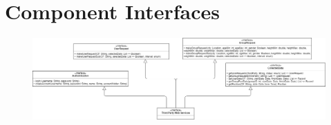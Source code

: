 \section{Component Interfaces}

\begin{figure}[H]
    \centering
    \includegraphics[scale=0.4]{DD/Pictures/compInterfDiagThirdPDD.png}
   
\end{figure}

